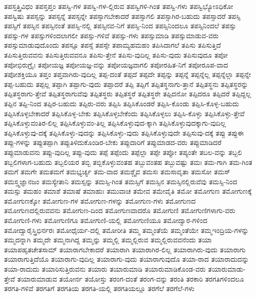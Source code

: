{ತಪಸ್ತತ್ತ್ರಿವಿಧಂ
ತಪಸ್ತಪ್ತಂ
ತಪಸ್ವಿ-ಗಳ
ತಪಸ್ವಿ-ಗಳ-ಲ್ಲಿರುವ
ತಪಸ್ವಿಗಳಿ-ಗಿಂತ
ತಪಸ್ವಿ-ಗಳು
ತಪಸ್ವಿಭ್ಯೋಽಧಿಕೋ
ತಪಸ್ವಿಷು
ತಪಸ್ಸನ್ನು
ತಪಸ್ಸನ್ನೆ
ತಪಸ್ಸನ್ನೇ
ತಪಸ್ಸಾಗಬೇಕಾದರೆ
ತಪಸ್ಸಾಗಲಿ
ತಪಸ್ಸಾಗಿರ-ಬಹುದು
ತಪಸ್ಸಾದರೆ
ತಪಸ್ಸಿ
ತಪಸ್ಸಿಗೆ
ತಪಸ್ಸಿನ
ತಪಸ್ಸಿನಂತೆ
ತಪಸ್ಸಿ-ನಲ್ಲಿ
ತಪಸ್ಸಿನವ-ನಿಗೆ
ತಪಸ್ಸಿ-ನಿಂದ
ತಪಸ್ಸಿನಿಂದಲೂ
ತಪಸ್ಸಿನಿಂದಲೆ
ತಪಸ್ಸು
ತಪಸ್ಸು-ಗಳ
ತಪಸ್ಸುಗಳಿಂದಲಾಗಲೀ
ತಪಸ್ಸು-ಗಳಿವೆ
ತಪಸ್ಸು-ಗಳು
ತಪಸ್ಸುಮಾಡಿ
ತಪಸ್ಸುಮಾಡುವ-ವರು
ತಪಸ್ಸುಮಾಡುವುದೊಂದು
ತಪಸ್ಸೂ
ತಪಸ್ಸೆ
ತಪಸ್ಸೇ
ತಪಾಮ್ಯಹಮಹಂ
ತಪಿಸಿದಾಗಲೆ
ತಪಿಸು
ತಪಿಸುತ್ತಿದೆ
ತಪಿಸುತ್ತಿರುವವನು
ತಪಿಸುತ್ತಿರುವವನೂ
ತಪಿಸು-ತ್ತೇನೆ
ತಪಿಸು-ವುದಿಲ್ಲ
ತಪಿಸು-ವುದು
ತಪಿಸುವುದೂ
ತಪೋ
ತಪೋಭಿರುಗ್ರೈಃ
ತಪೋಯಜ್ಞ
ತಪೋಯಜ್ಞ-ವನ್ನು
ತಪೋಯಜ್ಞವಾಗಲಿ
ತಪೋರಹಿತ-ನಿಗೆ
ತಪೋರೂಪ-ವಾದ
ತಪೋಶಕ್ತಿಯೂ
ತಪ್ತಂ
ತಪ್ತವಾಗಿರು-ವುದಿಲ್ಲ
ತಪ್ಪ-ದಂತೆ
ತಪ್ಪದೆ
ತಪ್ಪದೇ
ತಪ್ಪನ್ನು
ತಪ್ಪನ್ನೆ
ತಪ್ಪನ್ನೆಲ್ಲ
ತಪ್ಪನ್ನೆಲ್ಲಾ
ತಪ್ಪನ್ನೇ
ತಪ್ಪ-ಬಹುದು
ತಪ್ಪಲ್ಲ
ತಪ್ಪಾಗಿ
ತಪ್ಪಾಗು-ವುದು
ತಪ್ಪಾದರೆ
ತಪ್ಪಿ
ತಪ್ಪಿಗೆ
ತಪ್ಪಿತಸ್ಥನಾಗು-ತ್ತಾನೆ
ತಪ್ಪಿತಸ್ಥನು
ತಪ್ಪಿತಸ್ಥರನ್ನು
ತಪ್ಪಿತಸ್ಥರಾಗು-ತ್ತೇವೆ
ತಪ್ಪಿತಸ್ಥರಾಗುವೆವು
ತಪ್ಪಿತಸ್ಥರು
ತಪ್ಪಿತಸ್ಥರೆ
ತಪ್ಪಿತಸ್ಥರೇ
ತಪ್ಪಿದನೋ
ತಪ್ಪಿದರೂ
ತಪ್ಪಿದರೆ
ತಪ್ಪಿದ್ದಲ್ಲ
ತಪ್ಪಿನ
ತಪ್ಪಿ-ನಿಂದ
ತಪ್ಪಿರ-ಬಹುದು
ತಪ್ಪಿರು-ವರು
ತಪ್ಪಿಸಿ
ತಪ್ಪಿಸಿಕೊಂಡರೆ
ತಪ್ಪಿಸಿ-ಕೊಂಡು
ತಪ್ಪಿಸಿ-ಕೊಳ್ಳ-ಬಹುದು
ತಪ್ಪಿಸಿಕೊಳ್ಳಬೇಕಾದರೆ
ತಪ್ಪಿಸಿಕೊಳ್ಳ-ಬೇಕು
ತಪ್ಪಿಸಿಕೊಳ್ಳಬೇಕೆಂದು
ತಪ್ಪಿಸಿಕೊಳ್ಳಲು
ತಪ್ಪಿಸಿ-ಕೊಳ್ಳು
ತಪ್ಪಿಸಿಕೊಳ್ಳು-ತ್ತೇವೆ
ತಪ್ಪಿಸಿಕೊಳ್ಳುವಂತಿರ-ಲಿಲ್ಲ
ತಪ್ಪಿಸಿಕೊಳ್ಳುವಂ-ತಿಲ್ಲ
ತಪ್ಪಿಸಿಕೊಳ್ಳುವುದ-ಕ್ಕಾಗಿ
ತಪ್ಪಿಸಿಕೊಳ್ಳುವುದಕ್ಕಾಗು-ವುದಿಲ್ಲ
ತಪ್ಪಿಸಿಕೊಳ್ಳುವು-ದಕ್ಕೆ
ತಪ್ಪಿಸಿಕೊಳ್ಳು-ವುದನ್ನು
ತಪ್ಪಿಸಿಕೊಳ್ಳು-ವುದು
ತಪ್ಪಿಸಿಕೊಳ್ಳುವುದೇ
ತಪ್ಪಿಸುವು-ದಕ್ಕೆ
ತಪ್ಪು
ತಪ್ಪುಈ
ತಪ್ಪು-ಗಳನ್ನು
ತಪ್ಪುತಪ್ಪಾಗಿ
ತಪ್ಪುತಿಳಿದುಕೊಂಡಿರ-ಬೇಕು
ತಪ್ಪುದಾರಿಗೆ
ತಪ್ಪುಮಾಡದ-ವರು
ತಪ್ಪುಮಾಡಿದರೆ
ತಪ್ಪುಮಾಡುವನು
ತಪ್ಪು-ವುದಿಲ್ಲ
ತಪ್ಪು-ವುದು
ತಪ್ಪೆ
ತಪ್ಪೆಂದು
ತಪ್ಪೆಲ್ಲಾ
ತಪ್ಪೇ
ತಪ್ಪೋ
ತಪ್ಯಂತೇ
ತಬಲ-ವನ್ನು
ತಬ್ಬಲಿ
ತಬ್ಬಲಿಗಳಾಗ-ಬಹುದು
ತಬ್ಬಲಿಯರ
ತಬ್ಬಿ
ತಬ್ಬಿಕೊಳ್ಳುವಂತಹ
ತಬ್ಬುವಂತಹ
ತಬ್ಬುವಷ್ಟು
ತಮಃ
ತಮ-ಗಾಗಿ
ತಮ-ಗಿಂತ
ತಮಗೆ
ತಮಗೇ
ತಮತಮಗೆ
ತಮಭ್ಯರ್ಚ್ಯ
ತಮ-ವಾದ
ತಮಶ್ಚೈವ
ತಮಸಃ
ತಮಸಾವೃತಾ
ತಮಸೋ
ತಮಸ್
ತಮಸ್ತ್ವಜ್ಞಾನಜಂ
ತಮಸ್ಯೇತಾನಿ
ತಮಸ್ಸನ್ನು
ತಮಸ್ಸಿ-ಗಿಂತ
ತಮಸ್ಸಿಗೆ
ತಮಸ್ಸಿನ
ತಮಸ್ಸಿನಲ್ಲಿರುವೆವು
ತಮಸ್ಸಿ-ನಿಂದ
ತಮಸ್ಸು
ತಮಹಂ
ತಮಾಶೆ
ತಮಾಷೆ
ತಮಾಹುಃ
ತಮುವಾಚ
ತಮೇವ
ತಮೇವೈತಿ
ತಮೋ
ತಮೋಗುಣ
ತಮೋಗುಣಕ್ಕೆ
ತಮೋಗುಣಕ್ಕೋ
ತಮೋಗುಣ-ಗಳ
ತಮೋಗುಣ-ಗಳನ್ನು
ತಮೋಗುಣ-ಗಳು
ತಮೋಗುಣದ
ತಮೋಗುಣದಲ್ಲಿರುವವನು
ತಮೋಗುಣ-ದಿಂದ
ತಮೋಗುಣವಾದರೊ
ತಮೋಗುಣಿ
ತಮೋಗುಣಿಗಳಾಗು-ವರು
ತಮೋಗುಣಿ-ಗಳು
ತಮೋಗುಣಿಗೂ
ತಮೋಗುಣಿ-ಯಲ್ಲಿ
ತಮೋಗುಣಿಯೂ
ತಮೋದ್ವಾರ-ಗಳಿಂದ
ತಮೋದ್ವಾರೈಸ್ತ್ರಿಭಿರ್ನರಃ
ತಮೋಧೈರ್ಯ-ದಲ್ಲಿ
ತಮೋರೀತಿ
ತಮ್ಮ
ತಮ್ಮಂತೆಯೆ
ತಮ್ಮಂತೆಯೇ
ತಮ್ಮಇಂದ್ರಿಯ-ಗಳನ್ನು
ತಮ್ಮದನ್ನಾಗಿ
ತಮ್ಮದೇ
ತಮ್ಮನಾಗಿದ್ದ
ತಮ್ಮನ್ನು
ತಮ್ಮಲ್ಲಿ
ತಮ್ಮಲ್ಲಿರುವ
ತಮ್ಮಲ್ಲಿರುವವನೆಂದು
ತಯಾ
ತಯಾಪಹೃತಚೇತಸಾಮ್
ತಯಾರಾಗಬೇಕಾದರೆ
ತಯಾರಾಗಿ
ತಯಾರಾಗಿರ-ಲಿಲ್ಲ
ತಯಾರಾಗಿರು-ವುದು
ತಯಾರಾಗು
ತಯಾರಾಗುತ್ತಿದೆಯೊ
ತಯಾರಾಗು-ವುದಿಲ್ಲ
ತಯಾರಾಗು-ವುದು
ತಯಾರಾಗುವುದೊ
ತಯಾ-ರಾದ
ತಯಾರಾದುದನ್ನು
ತಯಾ-ರಾದುದು
ತಯಾರಿಸುತ್ತಿರುವನು
ತಯಾರು
ತಯಾರುಮಾಡಿ
ತಯಾರುಮಾಡಿಕೊಂಡ-ವರು
ತಯಾರುಮಾಡು-ತ್ತೇವೆ
ತಯಾರುಮಾಡುವ
ತಯೋರ್ನ
ತಯೋಸ್ತು
ತರಂಗ-ದಂತೆ
ತರಂಗ-ವನ್ನು
ತರಂತಿ
ತರಕಾರಿ
ತರಗತಿಗಳಿಂದಲೂ
ತರಗತಿ-ಗಳಿವೆ
ತರಗತಿಗೆ
ತರಗತಿಯ
ತರಗತಿ-ಯಲ್ಲಿ
ತರಗತಿಯಲ್ಲೂ
ತರಗೆಲೆ
ತರಗೆಲೆ-ಗಳು
}
